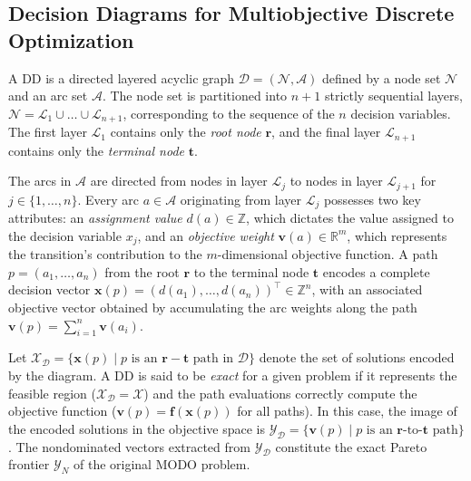 \documentclass[letterpaper]{article}
\begin{document}
\subsection{Decision Diagrams for Multiobjective Discrete Optimization}
\label{sec:prelim_dd}


A DD is a directed layered acyclic graph $\mathcal{D} = (\mathcal{N}, \mathcal{A})$ defined by a node set $\mathcal{N}$ and an arc set $\mathcal{A}$. The node set is partitioned into $n+1$ strictly sequential layers, $\mathcal{N} = \mathcal{L}_1 \cup \dots \cup \mathcal{L}_{n+1}$, corresponding to the sequence of the $n$ decision variables. The first layer $\mathcal{L}_1$ contains only the \emph{root node} $\mathbf{r}$, and the final layer $\mathcal{L}_{n+1}$ contains only the \emph{terminal node} $\mathbf{t}$. 

The arcs in $\mathcal{A}$ are directed from nodes in layer $\mathcal{L}_j$ to nodes in layer $\mathcal{L}_{j+1}$ for $j \in \{1, \dots, n\}$. Every arc $a \in \mathcal{A}$ originating from layer $\mathcal{L}_j$ possesses two key attributes: an \emph{assignment value} $d(a) \in \mathbb{Z}$, which dictates the value assigned to the decision variable $x_j$, and an \emph{objective weight} $\mathbf{v}(a) \in \mathbb{R}^m$, which represents the transition's contribution to the $m$-dimensional objective function. A path $p = (a_1, \dots, a_n)$ from the root $\mathbf{r}$ to the terminal node $\mathbf{t}$ encodes a complete decision vector $\mathbf{x}(p) = (d(a_1), \dots, d(a_n))^\top \in \mathbb{Z}^n$, with an associated objective vector obtained by accumulating the arc weights along the path $\mathbf{v}(p) = \sum_{i=1}^n \mathbf{v}(a_i)$.


Let $\mathcal{X}_{\mathcal{D}} = \{ \mathbf{x}(p) \mid p \text{ is an } \mathbf{r}-\mathbf{t} \text{ path in } \mathcal{D} \}$ denote the set of solutions encoded by the diagram. A DD is said to be \emph{exact} for a given problem if it represents the feasible region ($\mathcal{X}_{\mathcal{D}} = \mathcal{X}$) and the path evaluations correctly compute the objective function ($\mathbf{v}(p) = \mathbf{f}(\mathbf{x}(p))$ for all paths). In this case, the image of the encoded solutions in the objective space is $\mathcal{Y}_{\mathcal{D}} = \{ \mathbf{v}(p) \mid p \text{ is an } \mathbf{r}\text{-to-}\mathbf{t} \text{ path} \}$. The nondominated vectors extracted from $\mathcal{Y}_{\mathcal{D}}$ constitute the exact Pareto frontier $\mathcal{Y}_N$ of the original MODO problem. 
\end{document}
